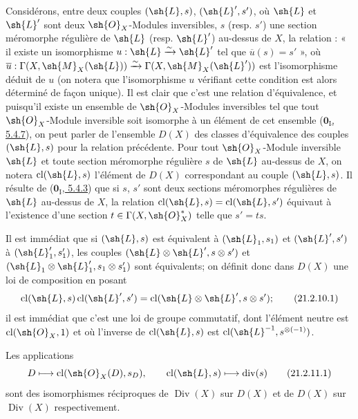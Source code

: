 \begin{env}[21.2.10]
\label{IV.21.2.10}
Considérons, entre deux couples $(\sh{L},s)$, $(\sh{L}',s')$, où $\sh{L}$ et $\sh{L}'$ sont deux $\sh{O}_X$-Modules inversibles, $s$ (resp. $s'$) une section méromorphe régulière de $\sh{L}$ (resp. $\sh{L}'$) au-dessus de $X$, la relation : « il existe un isomorphisme $u:\sh{L}\xrightarrow{\sim}\sh{L}'$ tel que $\overline{u}(s)=s'$ », où $\overline{u}:\Gamma(X,\sh{M}_X(\sh{L}))\xrightarrow{\sim}\Gamma(X,\sh{M}_X(\sh{L}'))$ est l'isomorphisme déduit de $u$ (on notera que l'isomorphisme $u$ vérifiant cette condition est alors déterminé de façon unique).
Il est clair que c'est une relation d'équivalence, et puisqu'il existe un ensemble de $\sh{O}_X$-Modules inversibles tel que tout $\sh{O}_X$-Module inversible soit isomorphe à un élément de cet ensemble (\hyperref[0.5.4.7]{$\mathbf{0}_{\mathrm I}$, 5.4.7}), on peut parler de l'ensemble $D(X)$ des classes d'équivalence des couples $(\sh{L},s)$ pour la relation précédente.
Pour tout $\sh{O}_X$-Module inversible $\sh{L}$ et toute section
méromorphe régulière $s$ de $\sh{L}$ au-dessus de $X$, on notera $\operatorname{cl}(\sh{L},s)$ l'élément de $D(X)$ correspondant au couple $(\sh{L},s)$.
Il résulte de (\hyperref[0.5.4.3]{$\mathbf{0}_{\mathrm I}$, 5.4.3}) que si $s$, $s'$ sont deux sections méromorphes régulières de $\sh{L}$ au-dessus de $X$, la relation $\operatorname{cl}(\sh{L},s)=\operatorname{cl}(\sh{L},s')$ équivaut à l'existence d'une section $t\in\Gamma(X,\sh{O}_X^*)$ telle que $s'=ts$.

Il est immédiat que si $(\sh{L},s)$ est équivalent à $(\sh{L}_1,s_1)$ et $(\sh{L}',s')$ à $(\sh{L}_1',s_1')$, les couples $(\sh{L}\otimes\sh{L}',s\otimes s')$ et $(\sh{L}_1\otimes\sh{L}_1',s_1\otimes s_1')$ sont équivalents;
on définit donc dans $D(X)$ une loi de composition en posant
\[
\label{IV.21.2.10.1}
  \operatorname{cl}(\sh{L},s)\operatorname{cl}(\sh{L}',s')=\operatorname{cl}(\sh{L}\otimes\sh{L}',s\otimes s');
  \tag{21.2.10.1}
\]
il est immédiat que c'est une loi de groupe commutatif, dont l'élément neutre est $\operatorname{cl}(\sh{O}_X,1)$ et où l'inverse de $\operatorname{cl}(\sh{L},s)$ est $\operatorname{cl}(\sh{L}^{-1},s^{\otimes(-1)})$.
\end{env}

\begin{proposition}[21.2.11]
Les applications
\[
\label{IV.21.2.11.1}
  D\mapsto\operatorname{cl}(\sh{O}_X(D),s_D),\qquad \operatorname{cl}(\sh{L},s)\mapsto\operatorname{div}(s)
  \tag{21.2.11.1}
\]
sont des isomorphismes réciproques de $\operatorname{Div}(X)$ sur $D(X)$ et de $D(X)$ sur $\operatorname{Div}(X)$ respectivement.
\end{proposition}

